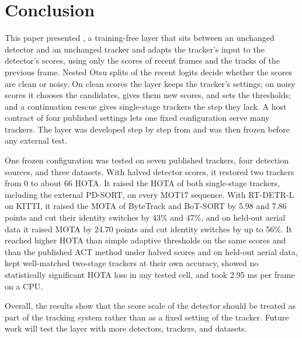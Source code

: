 \section{Conclusion}\label{sec:conclusion}

This paper presented \scl{}, a training-free layer that sits between an unchanged detector and an
unchanged tracker and adapts the tracker's input to the detector's scores, using only the scores of
recent frames and the tracks of the previous frame. Nested Otsu splits of the recent logits decide
whether the scores are clean or noisy. On clean scores the layer keeps the tracker's settings; on
noisy scores it chooses the candidates, gives them new scores, and sets the thresholds; and a
continuation rescue gives single-stage trackers the step they lack. A host contract of four
published settings lets one fixed configuration serve many trackers. The layer was developed step
by step from \aob{} and was then frozen before any external test.

One frozen configuration was tested on seven published trackers, four detection sources, and three
datasets. With halved detector scores, it restored two trackers from 0 to about 66 HOTA. It raised
the HOTA of both single-stage trackers, including the external PD-SORT, on every MOT17 sequence.
With RT-DETR-L on KITTI, it raised the MOTA of ByteTrack and BoT-SORT by 5.98 and 7.86 points and
cut their identity switches by 43\% and 47\%, and on held-out aerial data it raised MOTA by 24.70
points and cut identity switches by up to 56\%. It reached higher HOTA than simple adaptive
thresholds on the same scores and than the published ACT method under halved scores and on
held-out aerial data, kept well-matched two-stage trackers at their own accuracy, showed no
statistically significant HOTA loss in any tested cell, and took 2.95 ms per frame on a CPU.

Overall, the results show that the score scale of the detector should be treated as part of the
tracking system rather than as a fixed setting of the tracker. Future work will test the layer with
more detectors, trackers, and datasets.
